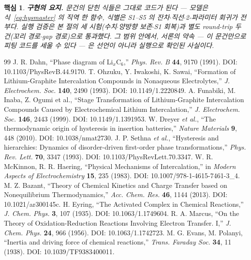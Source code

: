 \documentclass[11pt,a4paper]{article}
\newtheorem*{keybox}{핵심}
\begin{document}
\begin{keybox}
\textbf{구현의 요지.} 문건의 닫힌 식들은 그대로 코드가 된다 — 모델은 식~\eqref{eq:hysmaster} 의 직역
한 함수, 식별은 S1--S5 의 잔차$\cdot$직선$\cdot$2-파라미터 회귀가 전부다. 실행 검증은 본 절의 세
시험(수치$\cdot$양방향 보존$\cdot$S1 회복)과 별도 round-trip 두 건(꼬리 경로$\cdot$gap 경로)으로
통과했다. 그 범위 안에서, 서론의 약속 — 이 문건만으로 피팅 코드를 세울 수 있다 — 은 선언이 아니라
실행으로 확인된 사실이다.
\end{keybox}

\begin{thebibliography}{99}
 J. R. Dahn, ``Phase diagram of Li$_x$C$_6$,'' \emph{Phys. Rev. B} \textbf{44}, 9170 (1991). DOI: 10.1103/PhysRevB.44.9170.
 T. Ohzuku, Y. Iwakoshi, K. Sawai, ``Formation of Lithium-Graphite Intercalation Compounds in Nonaqueous Electrolytes,'' \emph{J. Electrochem. Soc.} \textbf{140}, 2490 (1993). DOI: 10.1149/1.2220849.
 A. Funabiki, M. Inaba, Z. Ogumi et al., ``Stage Transformation of Lithium-Graphite Intercalation Compounds Caused by Electrochemical Lithium Intercalation,'' \emph{J. Electrochem. Soc.} \textbf{146}, 2443 (1999). DOI: 10.1149/1.1391953.
 W. Dreyer \emph{et al.}, ``The thermodynamic origin of hysteresis in insertion batteries,'' \emph{Nature Materials} \textbf{9}, 448 (2010). DOI: 10.1038/nmat2730.
 J. P. Sethna \emph{et al.}, ``Hysteresis and hierarchies: Dynamics of disorder-driven first-order phase transformations,'' \emph{Phys. Rev. Lett.} \textbf{70}, 3347 (1993). DOI: 10.1103/PhysRevLett.70.3347.
 W. R. McKinnon, R. R. Haering, ``Physical Mechanisms of Intercalation,'' in \emph{Modern Aspects of Electrochemistry} \textbf{15}, 235 (1983). DOI: 10.1007/978-1-4615-7461-3\_4.
 M. Z. Bazant, ``Theory of Chemical Kinetics and Charge Transfer based on Nonequilibrium Thermodynamics,'' \emph{Acc. Chem. Res.} \textbf{46}, 1144 (2013). DOI: 10.1021/ar300145c.
 H. Eyring, ``The Activated Complex in Chemical Reactions,'' \emph{J. Chem. Phys.} \textbf{3}, 107 (1935). DOI: 10.1063/1.1749604.
 R. A. Marcus, ``On the Theory of Oxidation-Reduction Reactions Involving Electron Transfer. I,'' \emph{J. Chem. Phys.} \textbf{24}, 966 (1956). DOI: 10.1063/1.1742723.
 M. G. Evans, M. Polanyi, ``Inertia and driving force of chemical reactions,'' \emph{Trans. Faraday Soc.} \textbf{34}, 11 (1938). DOI: 10.1039/TF9383400011.

\end{thebibliography}
\end{document}
